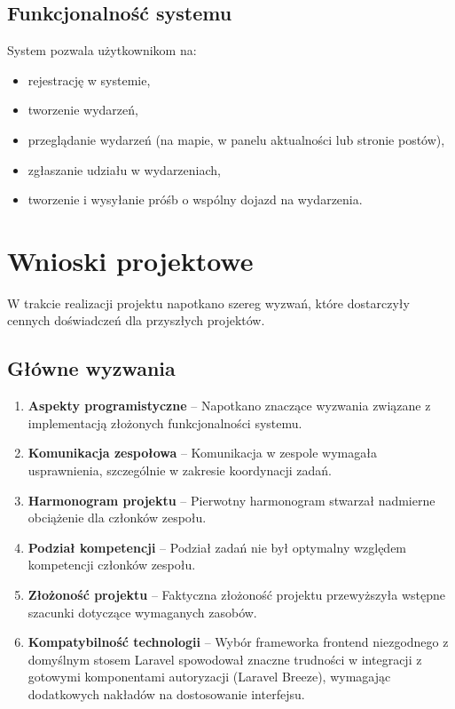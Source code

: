 \documentclass[12pt,a4paper]{article}
\begin{document}
\newpake

\subsection{Funkcjonalność systemu}

System pozwala użytkownikom na:
\begin{itemize}[itemsep=0pt]
    \item rejestrację w systemie,
    \item tworzenie wydarzeń,
    \item przeglądanie wydarzeń (na mapie, w panelu aktualności lub stronie postów),
    \item zgłaszanie udziału w wydarzeniach,
    \item tworzenie i wysyłanie próśb o wspólny dojazd na wydarzenia.
\end{itemize}

\section{Wnioski projektowe}

W trakcie realizacji projektu napotkano szereg wyzwań, które dostarczyły cennych doświadczeń dla przyszłych projektów.

\subsection{Główne wyzwania}

\begin{enumerate}[itemsep=3pt]
    \item \textbf{Aspekty programistyczne} -- Napotkano znaczące wyzwania związane z implementacją złożonych funkcjonalności systemu.
    
    \item \textbf{Komunikacja zespołowa} -- Komunikacja w zespole wymagała usprawnienia, szczególnie w zakresie koordynacji zadań.
    
    \item \textbf{Harmonogram projektu} -- Pierwotny harmonogram stwarzał nadmierne obciążenie dla członków zespołu.
    
    \item \textbf{Podział kompetencji} -- Podział zadań nie był optymalny względem kompetencji członków zespołu.
    
    \item \textbf{Złożoność projektu} -- Faktyczna złożoność projektu przewyższyła wstępne szacunki dotyczące wymaganych zasobów.
    
    \item \textbf{Kompatybilność technologii} -- Wybór frameworka frontend niezgodnego z domyślnym stosem Laravel spowodował znaczne trudności w integracji z gotowymi komponentami autoryzacji (Laravel Breeze), wymagając dodatkowych nakładów na dostosowanie interfejsu.
\end{enumerate}
\end{document}

